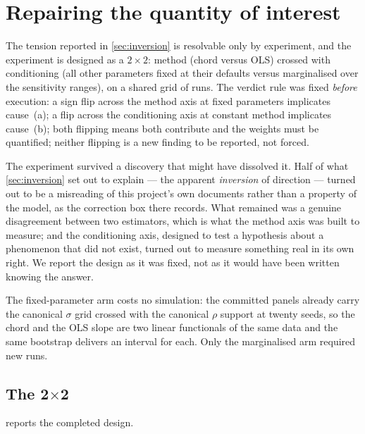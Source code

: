 
\section{Repairing the quantity of interest}
\label{sec:bridge}

The tension reported in \cref{sec:inversion} is resolvable only by experiment,
and the experiment is designed as a $2\times2$: method (chord versus OLS)
crossed with conditioning (all other parameters fixed at their defaults versus
marginalised over the sensitivity ranges), on a shared grid of runs. The
verdict rule was fixed \emph{before} execution: a sign flip across the method
axis at fixed parameters implicates cause~(a); a flip across the conditioning
axis at constant method implicates cause~(b); both flipping means both
contribute and the weights must be quantified; neither flipping is a new
finding to be reported, not forced.

The experiment survived a discovery that might have dissolved it. Half of what
\cref{sec:inversion} set out to explain --- the apparent \emph{inversion} of
direction --- turned out to be a misreading of this project's own documents
rather than a property of the model, as the correction box there records. What
remained was a genuine disagreement between two estimators, which is what the
method axis was built to measure; and the conditioning axis, designed to test
a hypothesis about a phenomenon that did not exist, turned out to measure
something real in its own right. We report the design as it was fixed, not as
it would have been written knowing the answer.

The fixed-parameter arm costs no simulation: the committed panels already carry
the canonical $\sigma$ grid crossed with the canonical $\rho$ support at
twenty seeds, so the chord and the OLS slope are two linear functionals of the
same data and the same bootstrap delivers an interval for each. Only the
marginalised arm required new runs.

\subsection{\texorpdfstring{The 2$\times$2}{The 2x2}}

 reports the completed design.

